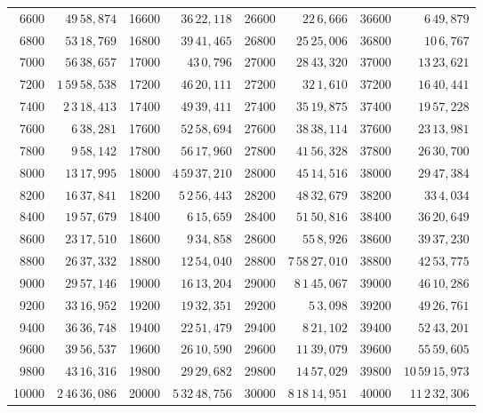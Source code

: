 \begin{tabular}{|r|r||r|r||r|r||r|r|}
6600 & \(49\,58,874\) & 16600 & \(36\,22,118\) & 26600 & \(22\,6,666\) & 36600 & \(6\,49,879\) \\
6800 & \(53\,18,769\) & 16800 & \(39\,41,465\) & 26800 & \(25\,25,006\) & 36800 & \(10\,6,767\) \\[1pt]
7000 & \(56\,38,657\) & 17000 & \(43\,0,796\) & 27000 & \(28\,43,320\) & 37000 & \(13\,23,621\) \\[1pt]
7200 & \(1\,59\,58,538\) & 17200 & \(46\,20,111\) & 27200 & \(32\,1,610\) & 37200 & \(16\,40,441\) \\
7400 & \(2\,3\,18,413\) & 17400 & \(49\,39,411\) & 27400 & \(35\,19,875\) & 37400 & \(19\,57,228\) \\
7600 & \(6\,38,281\) & 17600 & \(52\,58,694\) & 27600 & \(38\,38,114\) & 37600 & \(23\,13,981\) \\
7800 & \(9\,58,142\) & 17800 & \(56\,17,960\) & 27800 & \(41\,56,328\) & 37800 & \(26\,30,700\) \\[1pt]
8000 & \(13\,17,995\) & 18000 & \(4\,59\,37,210\) & 28000 & \(45\,14,516\) & 38000 & \(29\,47,384\) \\[1pt]
8200 & \(16\,37,841\) & 18200 & \(5\,2\,56,443\) & 28200 & \(48\,32,679\) & 38200 & \(33\,4,034\) \\
8400 & \(19\,57,679\) & 18400 & \(6\,15,659\) & 28400 & \(51\,50,816\) & 38400 & \(36\,20,649\) \\
8600 & \(23\,17,510\) & 18600 & \(9\,34,858\) & 28600 & \(55\,8,926\) & 38600 & \(39\,37,230\) \\
8800 & \(26\,37,332\) & 18800 & \(12\,54,040\) & 28800 & \(7\,58\,27,010\) & 38800 & \(42\,53,775\) \\[1pt]
9000 & \(29\,57,146\) & 19000 & \(16\,13,204\) & 29000 & \(8\,1\,45,067\) & 39000 & \(46\,10,286\) \\[1pt]
9200 & \(33\,16,952\) & 19200 & \(19\,32,351\) & 29200 & \(5\,3,098\) & 39200 & \(49\,26,761\) \\
9400 & \(36\,36,748\) & 19400 & \(22\,51,479\) & 29400 & \(8\,21,102\) & 39400 & \(52\,43,201\) \\
9600 & \(39\,56,537\) & 19600 & \(26\,10,590\) & 29600 & \(11\,39,079\) & 39600 & \(55\,59,605\) \\
9800 & \(43\,16,316\) & 19800 & \(29\,29,682\) & 29800 & \(14\,57,029\) & 39800 & \(10\,59\,15,973\) \\[1pt]
10000 & \(2\,46\,36,086\) & 20000 & \(5\,32\,48,756\) & 30000 & \(8\,18\,14,951\) & 40000 & \(11\,2\,32,306\) \\
\hline
\end{tabular}\par
\endgroup
\clearpage
